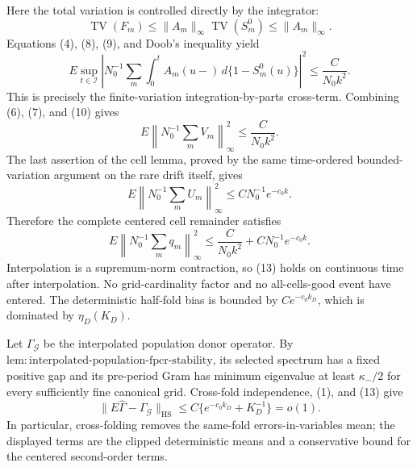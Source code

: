 Here the total variation is controlled directly by the integrator:
\[
 \operatorname{TV}(F_m)
 \leq \|A_m\|_\infty\operatorname{TV}(S_m^0)
 \leq\|A_m\|_\infty.                                    \tag{9}
\]
Equations (4), (8), (9), and Doob's inequality yield
\[
 E\sup_{t\in\mathcal I}
 \left|N_0^{-1}\sum_m
 \int_0^tA_m(u-)\,d\{1-S_m^0(u)\}\right|^2
 \leq\frac{C}{N_0k^2}.                                  \tag{10}
\]
This is precisely the finite-variation integration-by-parts cross-term.
Combining (6), (7), and (10) gives
\[
 E\left\|N_0^{-1}\sum_mV_m\right\|_\infty^2
 \leq\frac{C}{N_0k^2}.                                  \tag{11}
\]
The last assertion of the cell lemma, proved by the same time-ordered
bounded-variation argument on the rare drift itself, gives
\[
 E\left\|N_0^{-1}\sum_mU_m\right\|_\infty^2
 \leq CN_0^{-1}e^{-c_0k}.                               \tag{12}
\]
Therefore the complete centered cell remainder satisfies
\[
 E\left\|N_0^{-1}\sum_mq_m\right\|_\infty^2
 \leq\frac{C}{N_0k^2}+CN_0^{-1}e^{-c_0k}.               \tag{13}
\]
Interpolation is a supremum-norm contraction, so (13) holds on continuous
time after interpolation.  No grid-cardinality factor and no all-cells-good
event have entered.  The deterministic half-fold bias is bounded by
\(Ce^{-c_0k_D}\), which is dominated by \(\eta_D(K_D)\).

Let \(\Gamma_{\mathcal G}\) be the interpolated population donor operator.
By
\(\mathrm{lem:interpolated\mbox{-}population\mbox{-}fpcr\mbox{-}stability}\),
its selected spectrum has a fixed positive gap and its pre-period Gram has
minimum eigenvalue at least \(\kappa_-/2\) for every sufficiently fine
canonical grid.  Cross-fold independence, (1), and (13) give
\[
 \|E\widehat\Gamma-\Gamma_{\mathcal G}\|_{\mathrm{HS}}
 \leq C\{e^{-c_0k_D}+K_D^{-1}\}=o(1).                   \tag{14}
\]
In particular, cross-folding removes the same-fold errors-in-variables mean;
the displayed terms are the clipped deterministic means and a conservative
bound for the centered second-order terms.

